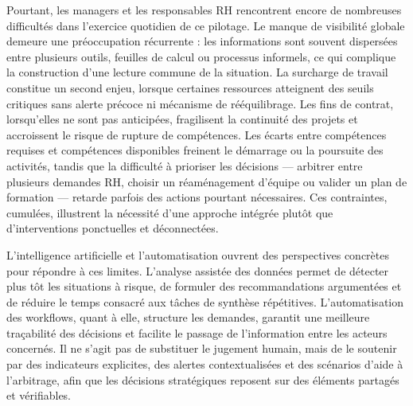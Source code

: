 Pourtant, les managers et les responsables RH rencontrent encore de nombreuses difficultés dans l'exercice quotidien de ce pilotage. Le manque de visibilité globale demeure une préoccupation récurrente : les informations sont souvent dispersées entre plusieurs outils, feuilles de calcul ou processus informels, ce qui complique la construction d'une lecture commune de la situation. La surcharge de travail constitue un second enjeu, lorsque certaines ressources atteignent des seuils critiques sans alerte précoce ni mécanisme de rééquilibrage. Les fins de contrat, lorsqu'elles ne sont pas anticipées, fragilisent la continuité des projets et accroissent le risque de rupture de compétences. Les écarts entre compétences requises et compétences disponibles freinent le démarrage ou la poursuite des activités, tandis que la difficulté à prioriser les décisions --- arbitrer entre plusieurs demandes RH, choisir un réaménagement d'équipe ou valider un plan de formation --- retarde parfois des actions pourtant nécessaires. Ces contraintes, cumulées, illustrent la nécessité d'une approche intégrée plutôt que d'interventions ponctuelles et déconnectées.

L'intelligence artificielle et l'automatisation ouvrent des perspectives concrètes pour répondre à ces limites. L'analyse assistée des données permet de détecter plus tôt les situations à risque, de formuler des recommandations argumentées et de réduire le temps consacré aux tâches de synthèse répétitives. L'automatisation des workflows, quant à elle, structure les demandes, garantit une meilleure traçabilité des décisions et facilite le passage de l'information entre les acteurs concernés. Il ne s'agit pas de substituer le jugement humain, mais de le soutenir par des indicateurs explicites, des alertes contextualisées et des scénarios d'aide à l'arbitrage, afin que les décisions stratégiques reposent sur des éléments partagés et vérifiables.

